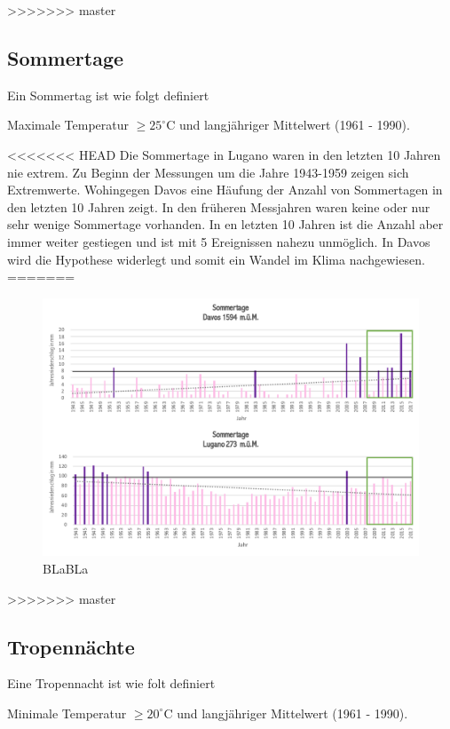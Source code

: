 \begin{refsection}
>>>>>>> master

\subsection{Sommertage}
Ein Sommertag ist wie folgt definiert

\begin{definition}
Maximale Temperatur $\ge 25^{\circ}$C und langjähriger Mittelwert (1961 - 1990).
\end{definition}

<<<<<<< HEAD
Die Sommertage in Lugano waren in den letzten 10 Jahren nie extrem. Zu Beginn der Messungen um die Jahre 1943-1959 zeigen sich Extremwerte. Wohingegen Davos eine Häufung der Anzahl von Sommertagen in den letzten 10 Jahren zeigt. In den früheren Messjahren waren keine oder nur sehr wenige Sommertage vorhanden. In en letzten 10 Jahren ist die Anzahl aber immer weiter gestiegen und ist mit 5 Ereignissen nahezu unmöglich. In Davos wird die Hypothese widerlegt und somit ein Wandel im Klima nachgewiesen.
=======
\begin{figure}[htbp]
\centering
\includegraphics[width=1.0\textwidth]{extrem/Sommertage.pdf}
\caption{BLaBLa}
\label{Sommertage}
\end{figure}
>>>>>>> master


\subsection{Tropennächte}
Eine Tropennacht ist wie folt definiert

\begin{definition}
Minimale Temperatur $\ge 20^{\circ}$C und langjähriger Mittelwert (1961 - 1990).
\end{definition}


\end{refsection}
